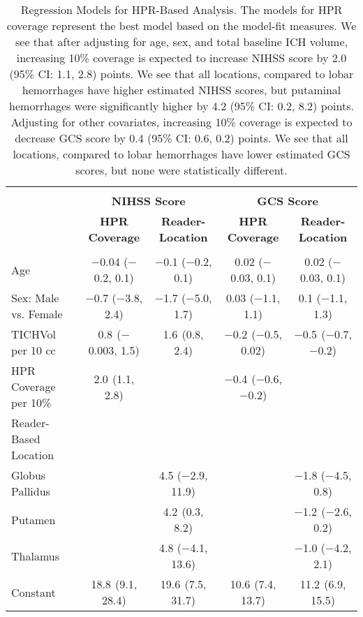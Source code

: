 
\begin{table}[!htbp] \centering 
\begin{tabular}{@{\extracolsep{5pt}}lcc|cc} 
\\[-1.8ex]\hline 
\\[-1.8ex] & \multicolumn{2}{c|}{\textbf{NIHSS Score}} & \multicolumn{2}{c}{\textbf{GCS Score}} \\ 
 & \textbf{HPR Coverage} & \textbf{Reader-Location} & \textbf{HPR Coverage} & \textbf{Reader-Location} \\ 
\hline \\[-1.8ex] 
 Age & $-$0.04 ($-$0.2, 0.1) & $-$0.1 ($-$0.2, 0.1) & 0.02 ($-$0.03, 0.1) & 0.02 ($-$0.03, 0.1) \\ 
  Sex: Male vs. Female & $-$0.7 ($-$3.8, 2.4) & $-$1.7 ($-$5.0, 1.7) & 0.03 ($-$1.1, 1.1) & 0.1 ($-$1.1, 1.3) \\ 
  TICHVol per 10 cc & 0.8$^{}$ ($-$0.003, 1.5) & 1.6$^{}$ (0.8, 2.4) & $-$0.2$^{}$ ($-$0.5, 0.02) & $-$0.5$^{}$ ($-$0.7, $-$0.2) \\ 
  HPR Coverage per 10\% & 2.0$^{}$ (1.1, 2.8) &  & $-$0.4$^{}$ ($-$0.6, $-$0.2) &  \\ 
  Reader-Based Location&&&& \\
\;\;Globus Pallidus &  & 4.5 ($-$2.9, 11.9) &  & $-$1.8 ($-$4.5, 0.8) \\ 
  \;\;Putamen &  & 4.2$^{}$ (0.3, 8.2) &  & $-$1.2$^{}$ ($-$2.6, 0.2) \\ 
  \;\;Thalamus &  & 4.8 ($-$4.1, 13.6) &  & $-$1.0 ($-$4.2, 2.1) \\ 
  Constant & 18.8$^{}$ (9.1, 28.4) & 19.6$^{}$ (7.5, 31.7) & 10.6$^{}$ (7.4, 13.7) & 11.2$^{}$ (6.9, 15.5) \\ 
\hline 
\end{tabular} 
  \caption{Regression Models for HPR-Based Analysis. The models for HPR coverage represent the best model based on the model-fit measures. We see that after adjusting for age, sex, and total baseline ICH volume, increasing 10\% coverage is expected to increase NIHSS score by 2.0 (95\% CI: 1.1, 2.8) points.  We see that all locations, compared to lobar hemorrhages have higher estimated NIHSS scores, but putaminal hemorrhages were significantly higher by 4.2 (95\% CI: 0.2, 8.2) points. Adjusting for other covariates, increasing 10\% coverage is expected to decrease GCS score by 0.4 (95\% CI: 0.6, 0.2) points.  We see that all locations, compared to lobar hemorrhages have lower estimated GCS scores, but none were statistically different.} 
  \label{f:beta} 
\end{table} 

